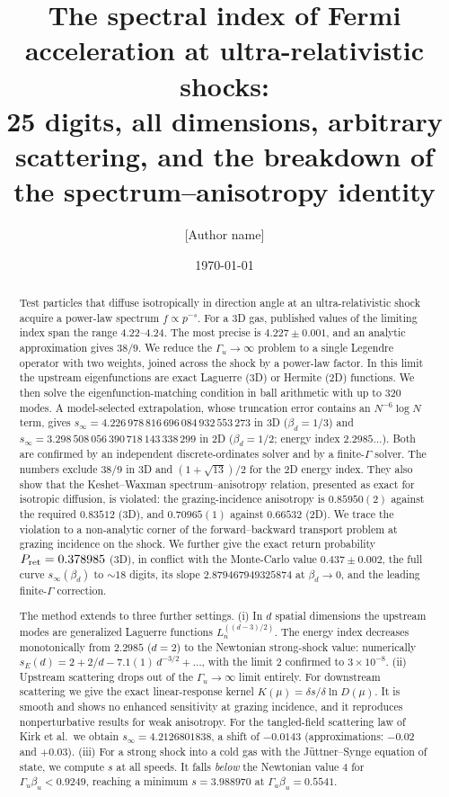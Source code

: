 \documentclass[aps,prd,twocolumn,superscriptaddress,nofootinbib,floatfix]{revtex4-2}
\newcommand{\sinf}{s_\infty}
\begin{document}
\title{The spectral index of Fermi acceleration at ultra-relativistic shocks:\\
25 digits, all dimensions, arbitrary scattering, and the breakdown of the spectrum--anisotropy identity}

\author{[Author name]}
\affiliation{[Affiliation]}

\date{\today}

\begin{abstract}
Test particles that diffuse isotropically in direction angle at an ultra-relativistic shock acquire a power-law
spectrum $f\propto p^{-s}$. For a 3D gas, published values of the limiting index span the range 4.22--4.24. The
most precise is $4.227\pm0.001$, and an analytic approximation gives $38/9$. We reduce the
$\Gamma_u\to\infty$ problem to a single Legendre operator with two weights, joined across the shock by a
power-law factor. In this limit the upstream eigenfunctions are exact Laguerre (3D) or Hermite (2D) functions.
We then solve the eigenfunction-matching condition in ball arithmetic with up to 320 modes. A model-selected
extrapolation, whose truncation error contains an $N^{-6}\log N$ term, gives
$\sinf=4.226\,978\,816\,696\,084\,932\,553\,273$ in 3D ($\beta_d=1/3$) and
$\sinf=3.298\,508\,056\,390\,718\,143\,338\,299$ in 2D ($\beta_d=1/2$; energy index $2.2985\ldots$). Both are
confirmed by an independent discrete-ordinates solver and by a finite-$\Gamma$ solver. The numbers exclude
$38/9$ in 3D and $(1+\sqrt{13})/2$ for the 2D energy index. They also show that the Keshet--Waxman
spectrum--anisotropy relation, presented as exact for isotropic diffusion, is violated: the grazing-incidence
anisotropy is $0.85950(2)$ against the required $0.83512$ (3D), and $0.70965(1)$ against $0.66532$ (2D). We trace
the violation to a non-analytic corner of the forward--backward transport problem at grazing incidence on the
shock. We further give the exact return probability $P_{\rm ret}=0.378985$ (3D), in conflict with the
Monte-Carlo value $0.437\pm0.002$, the full curve $\sinf(\beta_d)$ to ${\sim}18$ digits, its slope
$2.879467949325874$ at $\beta_d\to0$, and the leading finite-$\Gamma$ correction.

The method extends to three further settings.
(i) In $d$ spatial dimensions the upstream modes are generalized Laguerre functions $L_n^{((d-3)/2)}$. The
energy index decreases monotonically from $2.2985$ ($d=2$) to the Newtonian strong-shock value: numerically
$s_E(d)=2+2/d-7.1(1)\,d^{-3/2}+\ldots$, with the limit $2$ confirmed to $3\times10^{-8}$.
(ii) Upstream scattering drops out of the $\Gamma_u\to\infty$ limit entirely. For downstream scattering we give
the exact linear-response kernel $K(\mu)=\delta s/\delta\ln D(\mu)$. It is smooth and shows no enhanced
sensitivity at grazing incidence, and it reproduces nonperturbative results for weak anisotropy. For the tangled-field
scattering law of Kirk et al.\ we obtain $\sinf=4.2126801838$, a shift of $-0.0143$ (approximations: $-0.02$ and
$+0.03$).
(iii) For a strong shock into a cold gas with the J\"uttner--Synge equation of state, we compute $s$ at all
speeds. It falls \emph{below} the Newtonian value $4$ for $\Gamma_u\beta_u<0.9249$, reaching a minimum
$s=3.988970$ at $\Gamma_u\beta_u=0.5541$.
\end{abstract}
\end{document}
